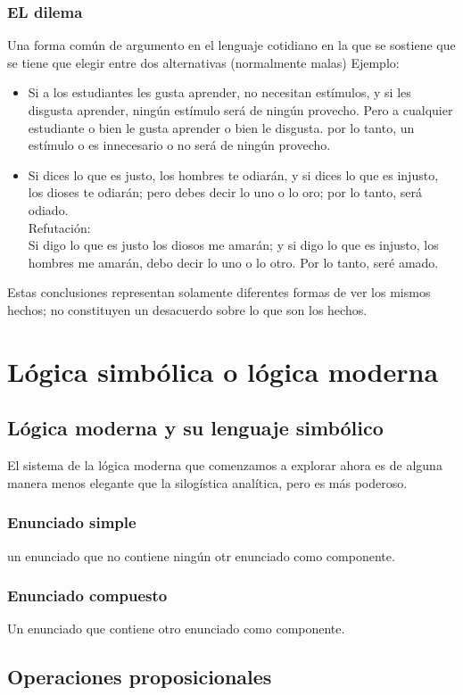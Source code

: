 \documentclass[10pt]{book} 						%
\begin{document}
\subsection{EL dilema}
Una forma común de argumento en el lenguaje cotidiano en la que se sostiene que se tiene que elegir entre dos alternativas (normalmente malas)
Ejemplo:
\begin{itemize}
\item Si a los estudiantes les gusta aprender, no necesitan estímulos, y si les disgusta aprender, ningún estímulo será de ningún provecho. Pero a cualquier estudiante o bien le gusta aprender o bien le disgusta. por lo tanto, un estímulo o es innecesario o no será de ningún provecho.
\item Si dices lo que es justo, los hombres te odiarán, y si dices lo que es injusto, los dioses te odiarán; pero debes decir lo uno o lo oro; por lo tanto, será odiado.\\
Refutación:\\
Si digo lo que es justo los diosos me amarán; y si digo lo que es injusto, los hombres me amarán, debo decir lo uno o lo otro. Por lo tanto, seré amado.
\end{itemize}
Estas conclusiones representan solamente diferentes formas de ver los mismos hechos; no constituyen un desacuerdo sobre lo que son los hechos.


\chapter{Lógica simbólica o lógica moderna}
\section{Lógica moderna y su lenguaje simbólico}
El sistema de la lógica moderna que comenzamos a explorar ahora es de alguna manera menos elegante que la silogística analítica, pero es más poderoso. 
\subsection{Enunciado simple}
un enunciado que no contiene ningún otr enunciado como componente.
\subsection{Enunciado compuesto}
Un enunciado que contiene otro enunciado como componente.
\section{Operaciones proposicionales}
\end{document}
